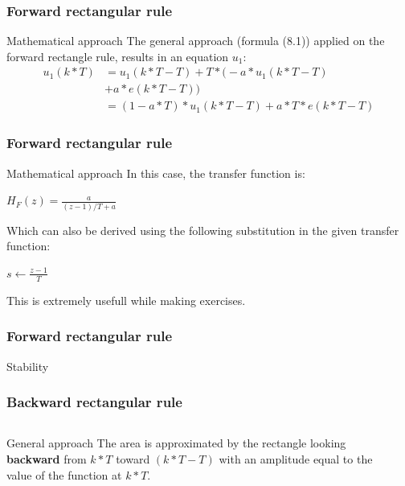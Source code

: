 \begin{frame}
	\frametitle{Forward rectangular rule}
	\begin{block}{Mathematical approach}
		The general approach (formula (8.1)) applied on the forward rectangle rule, results in an equation $u_1$:
		\begin{align*}
		u_1(k*T)& =u_1(k*T - T) + T*\big(-a*u_1(k*T - T)\\
		& + a*e(k*T - T) \big)\\
		& =(1 - a*T)*u_1(k*T - T) + a*T*e(k*T - T)
		\end{align*}
	\end{block}
\end{frame}

\begin{frame}
	\frametitle{Forward rectangular rule}
	\begin{block}{Mathematical approach}
		In this case, the transfer function is:
		\begin{center}
		$H_F(z) = \frac{a}{(z-1)/T+a}$
		\end{center}
		Which can also be derived using the following substitution in the given transfer function:
		\begin{center}
			$s \gets \frac{z-1}{T}$
		\end{center}
		This is extremely usefull while making exercises.
	\end{block}
\end{frame}
	
\begin{frame}
	\frametitle{Forward rectangular rule}
	\begin{block}{Stability}
	\end{block}
\end{frame}	

\begin{frame}
	\frametitle{Backward rectangular rule}
	\begin{columns}
		\begin{column}{0.5\textwidth}
			\begin{block}{General approach}
				The area is approximated by the rectangle looking \textbf{backward} from $k*T$ toward $(k*T - T)$ with an amplitude equal to the value of the function at $k*T$. 
			\end{block}	
		\end{column}
		
		\begin{column}{0.5\textwidth}
		\end{column}
		
	\end{columns}
\end{frame}

